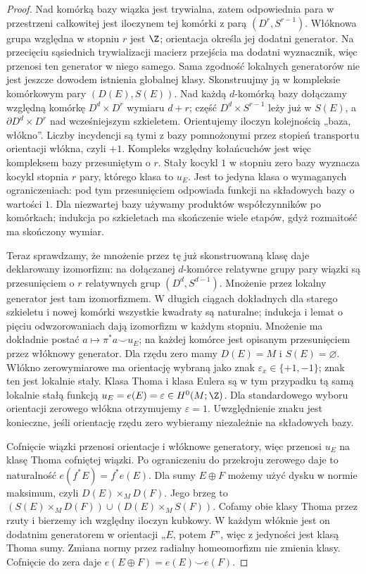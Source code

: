 \begin{proof}
Nad komórką bazy wiązka jest trywialna, zatem odpowiednia
para w przestrzeni całkowitej jest iloczynem tej komórki
z parą $(D^r,S^{r-1})$.
Włóknowa grupa względna
w stopniu $r$ jest $\Z$;
orientacja określa jej
dodatni generator.
Na przecięciu sąsiednich
trywializacji macierz
przejścia ma dodatni
wyznacznik, więc przenosi
ten generator w niego
samego. Sama zgodność lokalnych generatorów nie jest jeszcze
dowodem istnienia globalnej klasy. Skonstruujmy ją
w kompleksie komórkowym pary $(D(E),S(E))$.
Nad każdą $d$-komórką bazy dołączamy względną
komórkę $D^d\times D^r$ wymiaru $d+r$;
część $D^d\times S^{r-1}$ leży już w $S(E)$,
a $\partial D^d\times D^r$ nad wcześniejszym szkieletem.
Orientujemy iloczyn kolejnością „baza, włókno”.
Liczby incydencji są tymi z bazy pomnożonymi
przez stopień transportu orientacji włókna, czyli $+1$.
Kompleks względny kołańcuchów jest więc kompleksem
bazy przesuniętym o $r$. Stały kocykl $1$ w stopniu
zero bazy wyznacza kocykl stopnia $r$ pary,
którego klasa to $u_E$. Jest to jedyna klasa
o wymaganych ograniczeniach: pod tym przesunięciem
odpowiada funkcji na składowych bazy o wartości $1$.
Dla niezwartej bazy używamy produktów współczynników
po komórkach; indukcja po szkieletach ma skończenie
wiele etapów, gdyż rozmaitość ma skończony wymiar.

Teraz sprawdzamy, że mnożenie przez tę już
skonstruowaną klasę daje deklarowany izomorfizm:
na dołączanej $d$-komórce
relatywne grupy pary
wiązki są przesunięciem
o $r$ relatywnych grup
$(D^d,S^{d-1})$.
Mnożenie przez lokalny
generator jest tam
izomorfizmem. W długich
ciągach dokładnych
dla starego szkieletu
i nowej komórki wszystkie
kwadraty są naturalne;
indukcja i lemat o
pięciu odwzorowaniach
dają izomorfizm w
każdym stopniu.
Mnożenie ma dokładnie postać
$a\mapsto\pi^*a\smile u_E$; na każdej komórce
jest opisanym przesunięciem przez włóknowy generator.
Dla rzędu zero mamy $D(E)=M$ i $S(E)=\varnothing$.
Włókno zerowymiarowe ma orientację wybraną jako znak
$\varepsilon_x\in\{+1,-1\}$; znak ten jest lokalnie stały.
Klasa Thoma i klasa Eulera są w tym przypadku tą samą
lokalnie stałą funkcją
$u_E=e(E)=\varepsilon\in H^0(M;\Z)$.
Dla standardowego wyboru orientacji zerowego włókna
otrzymujemy $\varepsilon=1$. Uwzględnienie znaku jest
konieczne, jeśli orientację rzędu zero wybieramy
niezależnie na składowych bazy.

Cofnięcie wiązki przenosi
orientacje i włóknowe
generatory, więc przenosi
$u_E$ na klasę Thoma
cofniętej wiązki. Po
ograniczeniu do
przekroju zerowego
daje to naturalność
$e(f^*E)=f^*e(E)$.
Dla sumy $E\oplus F$ możemy użyć dysku w normie
maksimum, czyli $D(E)\times_M D(F)$. Jego brzeg to
$(S(E)\times_M D(F))\cup(D(E)\times_M S(F))$.
Cofamy obie klasy Thoma przez rzuty i bierzemy
ich względny iloczyn kubkowy. W każdym włóknie
jest on dodatnim generatorem w orientacji „$E$, potem $F$”,
więc z jedyności jest klasą Thoma sumy.
Zmiana normy przez radialny homeomorfizm nie zmienia
klasy. Cofnięcie do zera daje
$e(E\oplus F)=e(E)\smile e(F)$.


\end{proof}
